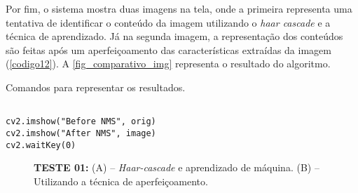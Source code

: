 Por fim, o sistema mostra duas imagens na tela, onde a primeira representa uma tentativa de identificar o conteúdo da imagem utilizando o \textit{haar cascade} e a técnica de aprendizado. Já na segunda imagem, a representação dos conteúdos são feitas após um aperfeiçoamento das características extraídas da imagem (\autoref{codigo12}). A \autoref{fig_comparativo_img} representa o resultado do algoritmo.

\begin{listing}[ht]
\caption{\label{codigo12}Comandos para representar os resultados.}
\begin{verbatim}

cv2.imshow("Before NMS", orig)
cv2.imshow("After NMS", image)
cv2.waitKey(0)

\end{verbatim}
\end{listing}

\begin{figure}[h]
	\caption{\label{fig_comparativo_img}\textbf{TESTE 01:} (A) – \textit{Haar-cascade} e aprendizado de máquina. (B) – Utilizando a técnica de aperfeiçoamento.}
	\begin{center}
	\end{center}
	\centering {}
\end{figure}